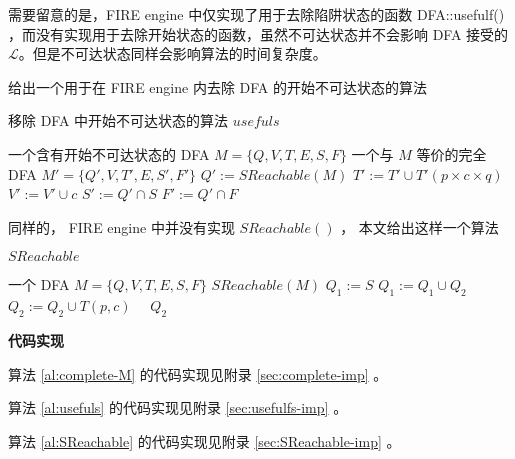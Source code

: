 需要留意的是，FIRE engine 中仅实现了用于去除陷阱状态的函数 DFA::usefulf() ，而没有实现用于去除开始状态的函数，虽然不可达状态并不会影响 DFA 接受的 $\mathcal{L} $。但是不可达状态同样会影响算法的时间复杂度。

给出一个用于在 FIRE engine 内去除 DFA 的开始不可达状态的算法

\begin{algorithm}
    \caption{ 移除 DFA 中开始不可达状态的算法 $usefuls$ }\label{al:usefuls}
    \begin{algorithmic}[1]
        \Require 一个含有开始不可达状态的 DFA $M=\{Q,V,T,E,S,F\}$
        \Ensure 一个与 $M$ 等价的完全 DFA $M'=\{Q',V,T',E,S',F'\}$
        \Statex {}
            \State $Q' := SReachable(M) $
                        \State $ T' := T' \cup T'(p\times c \times q) $
                        \State $ V' := V' \cup c $
                    \EndIf
                \EndFor
            \EndFor
            \State $S':=Q' \cap S$
            \State $F':=Q' \cap F$
        \EndFunction
    \end{algorithmic}
\end{algorithm}

同样的， FIRE engine 中并没有实现 $SReachable()$ ， 本文给出这样一个算法

\begin{algorithm}
    \caption{ $SReachable$ }\label{al:SReachable}
    \small%
    \begin{algorithmic}[1]
        \Require 一个 DFA $M=\{Q,V,T,E,S,F\}$
        \Ensure $SReachable(M)$
        \Statex %
            \State $ Q_1 := S $
            \Repeat
                \State $Q_1 := Q_1 \cup Q_2 $
                            $ Q_2 := Q_2 \cup T(p,c)  $
                        \EndIf
                    \EndFor
                \EndFor
             {~~$Q_2$}
        \EndFunction
    \end{algorithmic}
\end{algorithm}

{\bfseries 代码实现}

算法 \ref{al:complete-M} 的代码实现见附录 \ref{sec:complete-imp} 。

算法 \ref{al:usefuls} 的代码实现见附录 \ref{sec:usefulfs-imp} 。

算法 \ref{al:SReachable} 的代码实现见附录 \ref{sec:SReachable-imp} 。